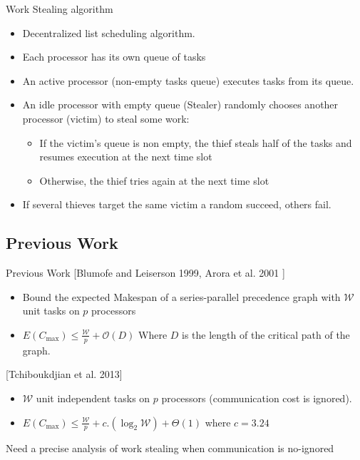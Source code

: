 \documentclass{beamer}
\begin{document}
\begin{frame}{Work Stealing algorithm}

 \begin{itemize}
     \item \alert{Decentralized list scheduling algorithm.}
         \pause
        \item { Each processor has its own queue of tasks}                                     
            \pause
        \item { An active processor (non-empty tasks queue) executes tasks from its queue.}
            \pause
        \item { An idle processor with empty queue (Stealer) randomly chooses another processor (victim) to steal some work:}                                     
            \pause
            \begin{itemize}
                \item {If the victim’s queue is non empty, the thief steals half of the tasks and resumes execution at the next time slot}
                    \pause
                \item {Otherwise, the thief tries again at the next time slot}
            \end{itemize}
        \pause 
        \item {If several thieves target the same victim a random succeed, others fail.} 

    \end{itemize}
\end{frame}


\subsection{Previous Work}

\begin{frame}{Previous Work}
    \color{blue} {[Blumofe and Leiserson 1999, Arora et al. 2001  ]}
        \begin{itemize}        
            \item Bound the expected Makespan of a series-parallel precedence graph with $\mathcal{W}$ unit tasks on $p$ processors
             \item $E(C_{\max}) \leq \frac{\mathcal{W}}{p}+\mathcal{O}(D)$  Where $D$ is the length of the critical path of the graph.
        \end{itemize}  
    \color{blue} [Tchiboukdjian et al. 2013] 
         \begin{itemize}        
             \item $\mathcal{W}$ unit independent tasks on $p$ processors (communication cost is ignored).  
             \item $E(C_{\max}) \leq \frac{\mathcal{W}}{p}+c.(\log_2 \mathcal{W})+\Theta(1)$ where $c=3.24$ 
        \end{itemize}  

        \alert{Need a precise analysis of work stealing when communication is no-ignored}
\end{frame}
\end{document}
